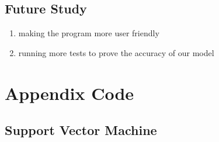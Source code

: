 \documentclass[10pt,letterpaper]{article}
\providecommand{\tightlist}{%
  \setlength{\itemsep}{0pt}\setlength{\parskip}{0pt}}
\begin{document}
\subsection{Future Study}\label{future-study}

\begin{enumerate}
\def\labelenumi{\arabic{enumi}.}
\tightlist
\item
  making the program more user friendly
\item
  running more tests to prove the accuracy of our model
\end{enumerate}

\section{Appendix Code}\label{appendix-code}

\subsection{Support Vector Machine}\label{support-vector-machine}
\end{document}
